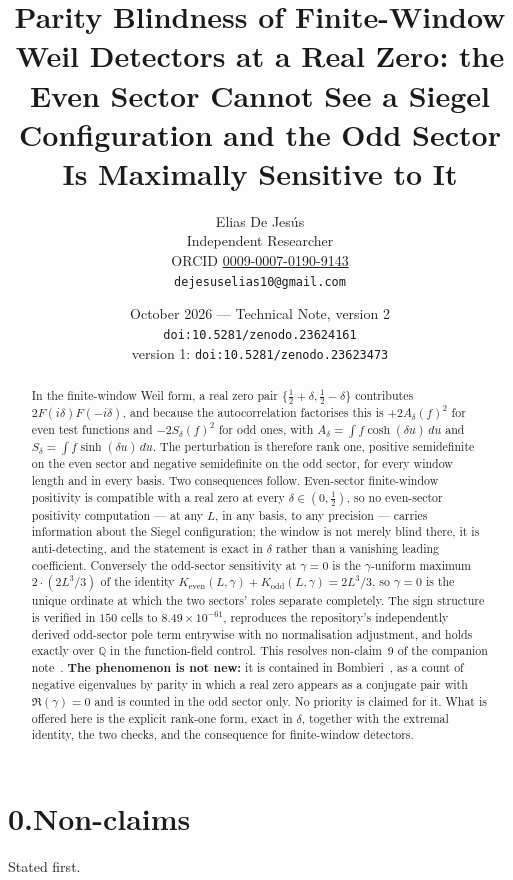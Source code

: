 \documentclass[11pt,a4paper]{article}
\title{\bfseries Parity Blindness of Finite-Window Weil Detectors at a Real Zero:
the Even Sector Cannot See a Siegel Configuration and the Odd Sector Is Maximally
Sensitive to It}
\author{Elias De Jes\'us\\[2pt]
{\small Independent Researcher}\\[1pt]
{\small ORCID \href{https://orcid.org/0009-0007-0190-9143}{0009-0007-0190-9143}}\\[1pt]
{\small \texttt{dejesuselias10@gmail.com}}}
\date{October 2026 --- Technical Note, version 2\\[2pt]
{\small\texttt{doi:10.5281/zenodo.23624161}}\\[1pt]
{\footnotesize version 1: \texttt{doi:10.5281/zenodo.23623473}}}
\theoremstyle{remark}
\newcommand{\Ad}{A_\delta}
\newcommand{\Sd}{S_\delta}
\begin{document}
\maketitle

\begin{abstract}
\noindent
In the finite-window Weil form, a real zero pair $\{\tfrac12+\delta,\tfrac12-\delta\}$
contributes $2F(i\delta)F(-i\delta)$, and because the autocorrelation factorises this is
$+2\Ad(f)^2$ for even test functions and $-2\Sd(f)^2$ for odd ones, with
$\Ad=\int f\cosh(\delta u)\,du$ and $\Sd=\int f\sinh(\delta u)\,du$. The perturbation is
therefore rank one, positive semidefinite on the even sector and negative semidefinite on
the odd sector, for every window length and in every basis. Two consequences follow. Even-sector
finite-window positivity is compatible with a real zero at every $\delta\in(0,\tfrac12)$,
so no even-sector positivity computation --- at any $L$, in any basis, to any precision ---
carries information about the Siegel configuration; the window is not merely blind there,
it is anti-detecting, and the statement is exact in $\delta$ rather than a vanishing
leading coefficient. Conversely the odd-sector sensitivity at $\gamma=0$ is the
$\gamma$-uniform maximum $2\cdot(2L^3/3)$ of the identity
$K_{\mathrm{even}}(L,\gamma)+K_{\mathrm{odd}}(L,\gamma)=2L^3/3$, so $\gamma=0$ is the
unique ordinate at which the two sectors' roles separate completely. The sign structure is
verified in $150$ cells to $8.49\times10^{-61}$, reproduces the repository's independently
derived odd-sector pole term entrywise with no normalisation adjustment, and holds exactly
over $\mathbb{Q}$ in the function-field control. This resolves non-claim~9 of the companion
note~\cite{DHnote}. \textbf{The phenomenon is not new:} it is contained in
Bombieri~\cite[\S9, Thm.~9]{Bombieri}, as a count of negative eigenvalues by parity in which
a real zero appears as a conjugate pair with $\Re(\gamma)=0$ and is counted in the odd
sector only. No priority is claimed for it. What is offered here is the explicit rank-one
form, exact in $\delta$, together with the extremal identity, the two checks, and the
consequence for finite-window detectors.
\end{abstract}

\section*{0.\quad Non-claims}

Stated first.
\end{document}
